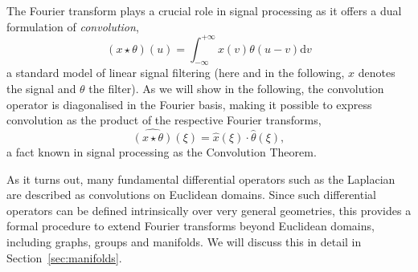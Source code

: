 %



%

The Fourier transform plays a crucial role in signal processing as it offers a dual formulation of {\em convolution}, 
$$
(x\star \theta)(u) = \int_{-\infty}^{+\infty} x(v)\theta(u-v) \mathrm{d}v
$$
a standard model of linear signal filtering (here and in the following, $x$ denotes the signal and $\theta$ the filter). 
%
As we will show in the following, the convolution operator is diagonalised in the Fourier basis, making it possible to express convolution as the product of the respective Fourier transforms, 
$$
\widehat{(x\star \theta)}(\xi) = \hat{x}(\xi) \cdot \hat{\theta}(\xi),
$$
a fact known in signal processing as the Convolution Theorem. 
%


As it turns out, many fundamental differential operators such as the Laplacian are described as convolutions on Euclidean domains. 
Since such differential operators can be defined intrinsically  over very general geometries, this provides a formal procedure to extend Fourier transforms beyond Euclidean domains, including graphs, groups and manifolds. We will discuss this in detail in Section~\ref{sec:manifolds}. %

